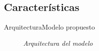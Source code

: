 \subsection{Características}
\begin{frame}{Arquitectura}{Modelo propuesto}
    \begin{figure}				
		\caption{\small \sl Arquitectura del modelo \cite{RethinkIOT,DoWeNeed,MobileEdgeComputing1,MobileEdgeComputing2,FogColony1}}
		\label{figure:Draft}
    \end{figure}
\end{frame}
